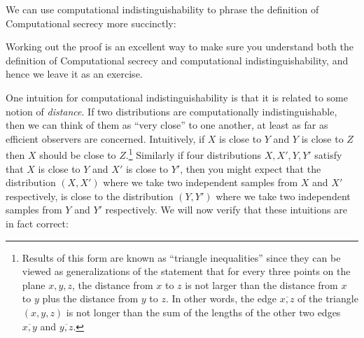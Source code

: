 We can use computational indistinguishability to phrase the definition
of Computational secrecy more succinctly:

\hypertarget{compindsecthm}{}

Working out the proof is an excellent way to make sure you understand
both the definition of Computational secrecy and computational
indistinguishability, and hence we leave it as an exercise.

One intuition for computational indistinguishability is that it is
related to some notion of \emph{distance}. If two distributions are
computationally indistinguishable, then we can think of them as ``very
close'' to one another, at least as far as efficient observers are
concerned. Intuitively, if \(X\) is close to \(Y\) and \(Y\) is close to
\(Z\) then \(X\) should be close to \(Z\).\footnote{Results of this form
  are known as ``triangle inequalities'' since they can be viewed as
  generalizations of the statement that for every three points on the
  plane \(x,y,z\), the distance from \(x\) to \(z\) is not larger than
  the distance from \(x\) to \(y\) plus the distance from \(y\) to
  \(z\). In other words, the edge \(\overline{x,z}\) of the triangle
  \((x,y,z)\) is not longer than the sum of the lengths of the other two
  edges \(\overline{x,y}\) and \(\overline{y,z}\).} Similarly if four
distributions \(X,X',Y,Y'\) satisfy that \(X\) is close to \(Y\) and
\(X'\) is close to \(Y'\), then you might expect that the distribution
\((X,X')\) where we take two independent samples from \(X\) and \(X'\)
respectively, is close to the distribution \((Y,Y')\) where we take two
independent samples from \(Y\) and \(Y'\) respectively. We will now
verify that these intuitions are in fact correct:

\hypertarget{triangleeqthm}{}

